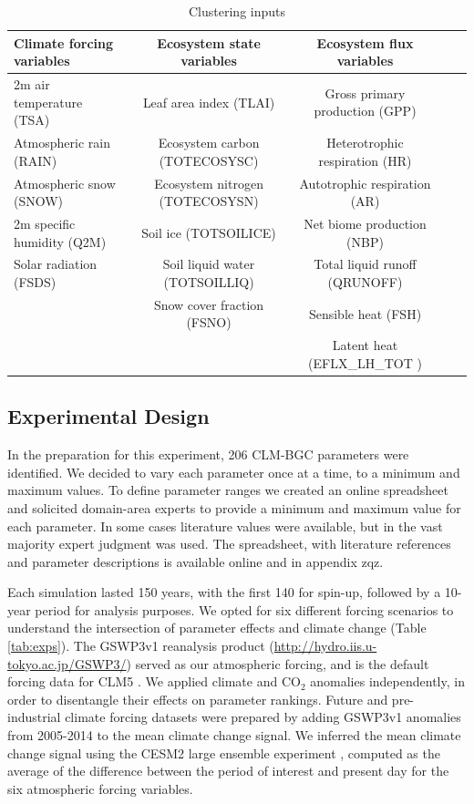 \documentclass[draft]{agujournal2019}
\begin{document}
\begin{table}[h]
\caption{Clustering inputs}
\centering
\begin{tabular}{l c c c c}
 \hline
 Climate forcing variables & Ecosystem state variables &Ecosystem flux variables \\
 \hline
 2m air temperature (TSA) & Leaf area index (TLAI) & Gross primary production (GPP) \\
Atmospheric rain (RAIN) & Ecosystem carbon (TOTECOSYSC) &Heterotrophic respiration (HR) \\
Atmospheric snow (SNOW) &  Ecosystem nitrogen (TOTECOSYSN) &Autotrophic respiration (AR) \\
2m specific humidity (Q2M) & Soil ice (TOTSOILICE) &Net biome production (NBP) \\
Solar radiation (FSDS) & Soil liquid water (TOTSOILLIQ) & Total liquid runoff (QRUNOFF) \\
& Snow cover fraction (FSNO) & Sensible heat  (FSH) \\
&&Latent heat (EFLX\_LH\_TOT ) \\
 \hline
 \end{tabular}
 \label{tab:sg}
 \end{table}


\subsection{Experimental Design}
In the preparation for this experiment, 206 CLM-BGC parameters were identified. We decided to vary each parameter once at a time, to a minimum and maximum values. To define parameter ranges we created an online spreadsheet and solicited domain-area experts to provide a minimum and maximum value for each parameter. In some cases literature values were available, but in the vast majority expert judgment was used. The spreadsheet, with literature references and parameter descriptions is available online and in appendix zqz.

Each simulation lasted 150 years, with the first 140 for spin-up, followed by a 10-year period for analysis purposes. We opted for six different forcing scenarios to understand the intersection of parameter effects and climate change (Table \ref{tab:exps}). The GSWP3v1 reanalysis product (\url{http://hydro.iis.u-tokyo.ac.jp/GSWP3/}) served as our atmospheric forcing, and is the default forcing data for CLM5 \cite{lawrence2019}. We applied climate and CO$_2$ anomalies independently, in order to disentangle their effects on parameter rankings. Future and pre-industrial climate forcing datasets were prepared by adding GSWP3v1 anomalies from 2005-2014 to the mean climate change signal. We inferred the mean climate change signal using the CESM2 large ensemble experiment \cite{rodgers2021}, computed as the average of the difference between the period of interest and present day for the six atmospheric forcing variables.
\end{document}

